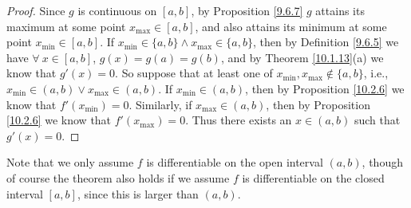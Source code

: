 \begin{proof}
    Since \(g\) is continuous on \([a, b]\), by Proposition \ref{9.6.7} \(g\) attains its maximum at some point \(x_{\max} \in [a, b]\), and also attains its minimum at some point \(x_{\min} \in [a, b]\).
    If \(x_{\min} \in \{a, b\} \land x_{\max} \in \{a, b\}\), then by Definition \ref{9.6.5} we have \(\forall\ x \in [a, b]\), \(g(x) = g(a) = g(b)\), and by Theorem \ref{10.1.13}(a) we know that \(g'(x) = 0\).
    So suppose that at least one of \(x_{\min}, x_{\max} \notin \{a, b\}\), i.e., \(x_{\min} \in (a, b) \lor x_{\max} \in (a, b)\).
    If \(x_{\min} \in (a, b)\), then by Proposition \ref{10.2.6} we know that \(f'(x_{\min}) = 0\).
    Similarly, if \(x_{\max} \in (a, b)\), then by Proposition \ref{10.2.6} we know that \(f'(x_{\max}) = 0\).
    Thus there exists an \(x \in (a, b)\) such that \(g'(x) = 0\).
\end{proof}

\begin{remark}\label{10.2.8}
    Note that we only assume \(f\) is differentiable on the open interval \((a, b)\), though of course the theorem also holds if we assume \(f\) is differentiable on the closed interval \([a, b]\), since this is larger than \((a, b)\).
\end{remark}
